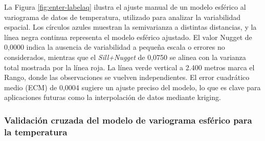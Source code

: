 \begin{enumerate}
  La Figura \ref{fig:enter-labelaq} ilustra el ajuste manual de un modelo esférico al variograma de datos de temperatura, utilizado para analizar la variabilidad espacial. Los círculos azules muestran la semivarianza a distintas distancias, y la línea negra continua representa el modelo esférico ajustado. El valor Nugget de 0,0000 indica la ausencia de variabilidad a pequeña escala o errores no considerados, mientras que el \textit{Sill+Nugget} de 0,0750 se alinea con la varianza total mostrada por la línea roja. La línea verde vertical a 2.400 metros marca el Rango, donde las observaciones se vuelven independientes. El error cuadrático medio (ECM) de 0,0004 sugiere un ajuste preciso del modelo, lo que es clave para aplicaciones futuras como la interpolación de datos mediante kriging.


 \end{enumerate}

\subsubsection{ Validación cruzada del modelo de variograma esférico para la temperatura}

